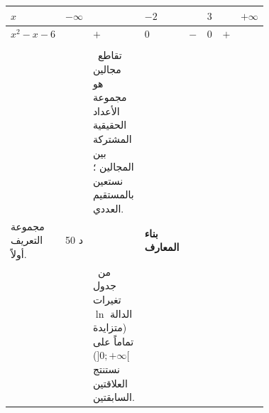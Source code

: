 \documentclass[12pt,a4paper]{article}
\newenvironment{LTR}{\begin{otherlanguage}{english}}{\end{otherlanguage}}
\newcommand{\ar}[1]{\foreignlanguage{arabic}{#1}}
\newcommand{\Phase}[1]{\textbf{#1}}
\newenvironment{Sayr}{%
\begin{LTR}\renewcommand{\arraystretch}{1.25}\setlength{\tabcolsep}{4pt}\relpenalty=10000\binoppenalty=10000\tolerance=9000\emergencystretch=0.3\linewidth
\begin{longtable}{|p{0.09\textwidth}|>{\centering\arraybackslash}p{0.05\textwidth}|p{0.71\textwidth}|>{\centering\arraybackslash}p{0.09\textwidth}|}
\hline\rowcolor{cThm!12}\ar{\footnotesize\textbf{توجيهات وتعاليق}} & \ar{\footnotesize\textbf{المدة}} & \ar{\textbf{سير الحصة}} & \ar{\footnotesize\textbf{مراحل الحصة}}\\\hline\endhead
\hline\endfoot}{\end{longtable}\end{LTR}}
\newcommand{\Row}[4]{\ar{\small #4} & \ar{#3} & \ar{#2} & \cellcolor{cThm!8}\ar{\Phase{#1}}\\\hline}
\newcommand{\Lab}[2]{\foreignlanguage{english}{\tcbox[on line,colback=#1,colframe=#1,boxrule=0pt,arc=2pt,boxsep=1pt,left=5pt,right=5pt,top=1pt,bottom=1pt]{\ar{\textcolor{white}{\textbf{#2}}}}}}
\newcommand{\ck}{\ensuremath{{\color{cRem}\checkmark}}}
\newcommand{\RR}[1]{\ifmmode{\color{cThm}#1}\else$\mbox{\color{cThm}#1}$\fi}
\newcommand{\T}[1]{$\mbox{\color{cDef}\bfseries #1}$}
\begin{document}
\begin{Sayr}
\Row{}{%
\Lab{cDef}{تابع المناقشة}\par\textbf{(2)} \T{حل} \T{المتراجحة} \T{$(\spadesuit)$:} المتراجحة $(\spadesuit)$ مُعرّفة على $D$ ، و $(\spadesuit)$ تكافئ: $x^2-1<x+5$ ومنه: $x^2-x-6<0$ حيث:\par\smallskip\begin{LTR}\centering {\renewcommand{\arraystretch}{1.6}\setlength{\tabcolsep}{1pt}\begin{tabular}{|>{\centering\arraybackslash}p{0.240\linewidth}|>{\centering\arraybackslash}p{0.103\linewidth}>{\centering\arraybackslash}p{0.103\linewidth}>{\centering\arraybackslash}p{0.103\linewidth}>{\centering\arraybackslash}p{0.103\linewidth}>{\centering\arraybackslash}p{0.103\linewidth}>{\centering\arraybackslash}p{0.103\linewidth}>{\centering\arraybackslash}p{0.103\linewidth}|}\hline\rowcolor{cSec!12}$x$ & $-\infty$ &  & $-2$ &  & $3$ &  & $+\infty$\\\hline $x^2-x-6$ &  & $+$ & $0$ & $-$ & $0$ & $+$ & \\\hline \end{tabular}}\end{LTR}\par أي: $x\in]-2;3[$ ، وبالتالي: $S^{\prime}=]-2;3[\cap D$ حيث:\par\smallskip\begin{LTR}\centering \begin{tikzpicture}[x=0.8cm,font=\small] \draw[->] (-7,0)--(5,0);\draw[cDef,line width=2pt] (-5,0.25)--(-1,0.25);\draw[cDef,line width=2pt] (1,0.25)--(5,0.25);\draw[cThm,line width=2pt] (-2,-0.25)--(3,-0.25);\draw (-5,0.15)--(-5,-0.15) node[below]{$-5$};\draw (-2,0.15)--(-2,-0.15) node[below]{$-2$};\draw (-1,0.15)--(-1,-0.15) node[below]{$-1$};\draw (1,0.15)--(1,-0.15) node[below]{$1$};\draw (3,0.15)--(3,-0.15) node[below]{$3$};\end{tikzpicture}\end{LTR}\par فيكون: $\RR{S^{\prime}=]-2;-1[\cup]1;3[}$.}{}{}
\Row{}{%
\Lab{cRem}{ملاحظات}\ تقاطع مجالين هو مجموعة الأعداد الحقيقية المشتركة بين المجالين ؛ نستعين بالمستقيم العددي.}{}{}
\Row{بناء المعارف}{%
\Lab{cThm}{مبرهنة}\ من أجل $a$ و $b$ عددين حقيقيين موجبين تماماً لدينا:\ck\ $\ln(a)=\ln(b)$ معناه $\RR{a=b}$.\par
\ck\ $\ln(a)\leqslant\ln(b)$ معناه $\RR{a\leqslant b}$.\par
}{50 د}{مجموعة التعريف أولاً.}
\Row{}{%
\Lab{cMeth}{البرهان}\ من جدول تغيرات الدالة $\ln$ (متزايدة تماماً على $]0;+\infty[$) نستنتج العلاقتين السابقتين.}{}{}

\end{Sayr}
\end{document}
